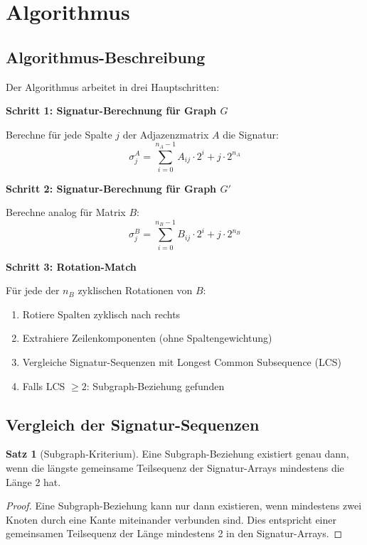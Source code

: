 ﻿\documentclass[a4paper,12pt]{article}
\theoremstyle{definition}
\newtheorem{satz}{Satz}[section]
\begin{document}
\section{Algorithmus}

\subsection{Algorithmus-Beschreibung}

Der Algorithmus arbeitet in drei Hauptschritten:

\textbf{Schritt 1: Signatur-Berechnung f\"ur Graph $G$}

Berechne f\"ur jede Spalte $j$ der Adjazenzmatrix $A$ die Signatur:
\[
\sigma_j^A = \sum_{i=0}^{n_A-1} A_{ij} \cdot 2^i + j \cdot 2^{n_A}
\]

\textbf{Schritt 2: Signatur-Berechnung f\"ur Graph $G'$}

Berechne analog f\"ur Matrix $B$:
\[
\sigma_j^B = \sum_{i=0}^{n_B-1} B_{ij} \cdot 2^i + j \cdot 2^{n_B}
\]

\textbf{Schritt 3: Rotation-Match}

F\"ur jede der $n_B$ zyklischen Rotationen von $B$:
\begin{enumerate}
	\item Rotiere Spalten zyklisch nach rechts
	\item Extrahiere Zeilenkomponenten (ohne Spaltengewichtung)
	\item Vergleiche Signatur-Sequenzen mit Longest Common Subsequence (LCS)
	\item Falls LCS $\geq 2$: Subgraph-Beziehung gefunden
\end{enumerate}

\subsection{Vergleich der Signatur-Sequenzen}

\begin{satz}[Subgraph-Kriterium]
	Eine Subgraph-Beziehung existiert genau dann, wenn die l\"angste
	gemeinsame Teilsequenz der Signatur-Arrays mindestens die L\"ange 2 hat.
\end{satz}

\begin{proof}
	Eine Subgraph-Beziehung kann nur dann existieren, wenn mindestens zwei
	Knoten durch eine Kante miteinander verbunden sind. Dies entspricht einer
	gemeinsamen Teilsequenz der L\"ange mindestens 2 in den Signatur-Arrays.
\end{proof}
\end{document}
